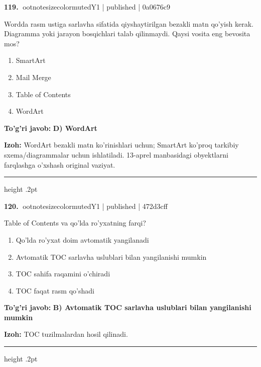 \documentclass[10pt,a4paper]{article}
\begin{document}
\textbf{\color{ink}119.} {ootnotesizecolor{muted}Y1 | published | 0a0676c9}
\par
Wordda rasm ustiga sarlavha sifatida qiyshaytirilgan bezakli matn qo'yish kerak. Diagramma yoki jarayon bosqichlari talab qilinmaydi. Qaysi vosita eng bevosita mos?
\begin{enumerate}[label=\Alph*),leftmargin=9mm]
\item SmartArt
\item Mail Merge
\item Table of Contents
\item WordArt
\end{enumerate}
\begin{tcolorbox}[enhanced,breakable,colback=teal!4,colframe=teal!55!black,boxrule=0.45pt,arc=1.2mm,left=2.8mm,right=2.8mm,top=2mm,bottom=2mm]
\textbf{\color{teal}To'g'ri javob:} \textbf{D) WordArt}
\par\smallskip
\textbf{Izoh:} WordArt bezakli matn ko'rinishlari uchun; SmartArt ko'proq tarkibiy sxema/diagrammalar uchun ishlatiladi. 13-aprel manbasidagi obyektlarni farqlashga o'xshash original vaziyat.
\end{tcolorbox}
\vspace{2mm}\hrule height .2pt\vspace{2mm}

\textbf{\color{ink}120.} {ootnotesizecolor{muted}Y1 | published | 472d3cff}
\par
Table of Contents va qo'lda ro'yxatning farqi?
\begin{enumerate}[label=\Alph*),leftmargin=9mm]
\item Qo'lda ro'yxat doim avtomatik yangilanadi
\item Avtomatik TOC sarlavha uslublari bilan yangilanishi mumkin
\item TOC sahifa raqamini o'chiradi
\item TOC faqat rasm qo'shadi
\end{enumerate}
\begin{tcolorbox}[enhanced,breakable,colback=teal!4,colframe=teal!55!black,boxrule=0.45pt,arc=1.2mm,left=2.8mm,right=2.8mm,top=2mm,bottom=2mm]
\textbf{\color{teal}To'g'ri javob:} \textbf{B) Avtomatik TOC sarlavha uslublari bilan yangilanishi mumkin}
\par\smallskip
\textbf{Izoh:} TOC tuzilmalardan hosil qilinadi.
\end{tcolorbox}
\vspace{2mm}\hrule height .2pt\vspace{2mm}
\end{document}
